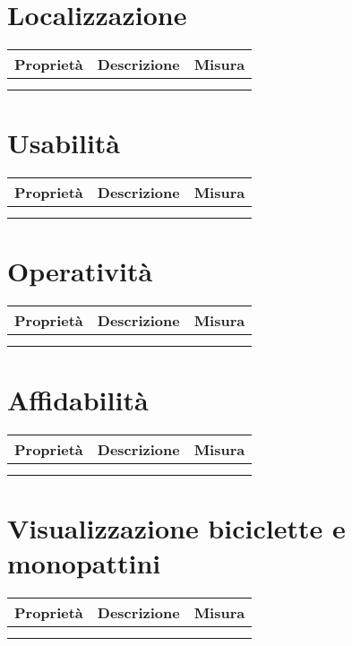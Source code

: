 \section{Localizzazione}
\begin{tabular}{|l|l|l|}
    \hline
    \multicolumn{1}{|c|}{\textbf{Proprietà}} & \textbf{Descrizione} & \textbf{Misura} \\
    \hline
     &  & \\
    \hline
     &  & \\
    \hline
\end{tabular}

\section{Usabilità}
\begin{tabular}{|l|l|l|}
    \hline
    \multicolumn{1}{|c|}{\textbf{Proprietà}} & \textbf{Descrizione} & \textbf{Misura} \\
    \hline
     &  & \\
    \hline
     &  & \\
    \hline
\end{tabular}

\section{Operatività}
\begin{tabular}{|l|l|l|}
    \hline
    \multicolumn{1}{|c|}{\textbf{Proprietà}} & \textbf{Descrizione} & \textbf{Misura} \\
    \hline
     &  & \\
    \hline
     &  & \\
    \hline
\end{tabular}

\section{Affidabilità}
\begin{tabular}{|l|l|l|}
    \hline
    \multicolumn{1}{|c|}{\textbf{Proprietà}} & \textbf{Descrizione} & \textbf{Misura} \\
    \hline
     &  & \\
    \hline
     &  & \\
    \hline
\end{tabular}

\section{Visualizzazione biciclette e monopattini}
\begin{tabular}{|l|l|l|}
    \hline
    \multicolumn{1}{|c|}{\textbf{Proprietà}} & \textbf{Descrizione} & \textbf{Misura} \\
    \hline
     &  & \\
    \hline
     &  & \\
    \hline
\end{tabular}

